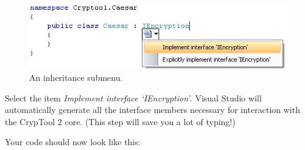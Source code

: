 \begin{figure}[h!]
	\centering
		\includegraphics{figures/inherit_submenu.jpg}
	\caption{An inheritance submenu.}
	\label{fig:inherit_submenu}
\end{figure}

Select the item \textit{Implement interface `IEncryption'}. Visual Studio will automatically generate all the interface members necessary for interaction with the CrypTool 2 core. (This step will save you a lot of typing!)
\clearpage

\noindent Your code should now look like this:


